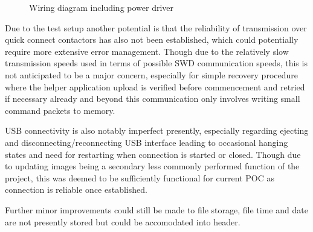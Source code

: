 \begin{figure}[ht]
	\centering
	\caption{Wiring diagram including power driver}
	\label{fig:Wiringwithpowerdriver}
\end{figure}

Due to the test setup another potential is that the reliability of transmission over quick connect contactors has also not been established, which could potentially require more extensive error management. Though due to the relatively slow transmission speeds used in terms of possible SWD communication speeds, this is not anticipated to be a major concern, especially for simple recovery procedure where the helper application upload is verified before commencement and retried if necessary already and beyond this communication only involves writing small command packets to memory.

USB connectivity is also notably imperfect presently, especially regarding ejecting and disconnecting/reconnecting USB interface leading to occasional hanging states and need for restarting when connection is started or closed. Though due to updating images being a secondary less commonly performed function of the project, this was deemed to be sufficiently functional for current POC as connection is reliable once established.

Further minor improvements could still be made to file storage, file time and date are not presently stored but could be accomodated into header.